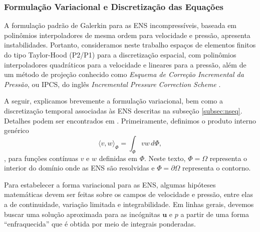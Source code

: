 \subsubsection{Formulação Variacional e Discretização das Equações}

A formulação padrão de Galerkin para as ENS incompressíveis, baseada em polinômios interpoladores de mesma ordem para velocidade e pressão, apresenta instabilidades. Portanto, consideramos neste trabalho espaços de elementos finitos do tipo Taylor-Hood (P2/P1) para a discretização espacial, com polinômios interpoladores quadráticos para a velocidade e lineares para a pressão, além de um método de projeção \cite{CHORIN} conhecido como \emph{Esquema de Correção Incremental da Pressão}, ou IPCS, do inglês \emph{Incremental Pressure Correction Scheme} \cite{Goda}.

A seguir, explicamos brevemente a formulação variacional, bem como a discretização temporal associadas às ENS descritas 
na subseção \ref{subsec:nseq}. Detalhes podem ser encontrados em \cite{Langtangen}. Primeiramente, definimos o produto interno genérico
\begin{equation}
\langle v,w \rangle_{\Phi} = \int_{\Phi} v w \,d\Phi,
\end{equation},
para funções contínuas $v$ e $w$ definidas em $\Phi$. Neste texto, $\Phi = \Omega$ representa o interior do domínio onde as ENS são resolvidas e $\Phi = \partial \Omega$ representa o contorno.

Para estabelecer a forma variacional para as ENS, algumas hipóteses matemáticas devem ser feitas sobre os campos de velocidade e pressão, entre elas a de continuidade, variação limitada e integrabilidade. Em linhas gerais, devemos buscar uma solução aproximada para as incógnitas $\boldsymbol{u}$ e $p$ a partir de uma forma ``enfraquecida'' que é obtida por meio de integrais ponderadas. 

